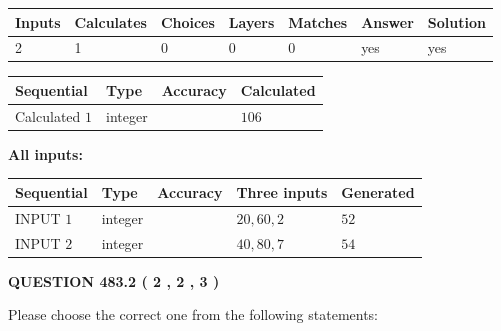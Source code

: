 \documentclass[12pt]{article}
\begin{document}
 
\noindent{}
 
 

 
   
   
   
   
\noindent\begin{tabular}{|l|l|l|l|l|l|l|}
 \hline
Inputs & Calculates & Choices & Layers & Matches & Answer & Solution \\ \hline
 2  & 
 1  & 
 0
  & 
 0  & 
 0  & 
  yes & 
  yes 
  \\ \hline
 \end{tabular}
   
   
   
   
\noindent{}
   
   
  
  
\noindent\begin{tabular}{|l|l|l|l|}
\hline
 Sequential & Type & Accuracy & Calculated \\ 
\hline
 
 
  Calculated $  1 $ & integer &  & 
  $ 106 $ 
 \\  \hline  
 \end{tabular}
   
   
   
   
\noindent\vspace{0.1in}\hspace{-0.08in} {\textbf{\Large{All inputs: }}}
   
   
  
  
\noindent\begin{tabular}{|l|l|l|l|l|}
\hline
 Sequential & Type & Accuracy & Three inputs & Generated \\ 
\hline
 
 
  INPUT $  1 $ & integer &  & $
 20
 , 
 60
 , 
 2
 $ & $ 52 $ 
 \\  \hline  
 
 
  INPUT $  2 $ & integer &  & $
 40
 , 
 80
 , 
 7
 $ & $ 54 $ 
 \\  \hline  
 \end{tabular}
   
   
  
\vspace{0.2in}
  
{\textbf{\Large{QUESTION
483.2 
 ( 2 , 2 , 3 )
}}}
  
  
Please choose the correct one from the following statements:
 
\end{document}
